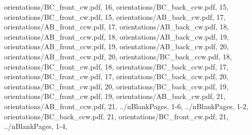 \documentclass[letterpaper]{article}
\begin{document}
{			orientations/BC_front_cw.pdf, 	16,	
			orientations/BC_back_ccw.pdf, 	15,	
			orientations/BC_front_cw.pdf, 	15,	
			orientations/AB_back_cw.pdf, 		17,
			orientations/AB_front_ccw.pdf, 	17,
			orientations/AB_back_cw.pdf, 		18,
			orientations/AB_front_ccw.pdf, 	18,
			orientations/AB_back_cw.pdf, 		19,
			orientations/AB_front_ccw.pdf, 	19,
			orientations/AB_back_cw.pdf, 		20,
			orientations/AB_front_ccw.pdf, 	20,
			orientations/BC_back_ccw.pdf, 	18,	
			orientations/BC_front_cw.pdf, 	18,	
			orientations/BC_back_ccw.pdf, 	17,	
			orientations/BC_front_cw.pdf, 	17,	
			orientations/BC_back_ccw.pdf, 	20,	
			orientations/BC_front_cw.pdf, 	20,	
			orientations/BC_back_ccw.pdf, 	19,	
			orientations/BC_front_cw.pdf, 	19,	
			orientations/AB_back_cw.pdf, 		21,
			orientations/AB_front_ccw.pdf, 	21,
			../nBlankPages,							1-6,
			../nBlankPages,							1-2,
			orientations/BC_back_ccw.pdf, 	21,	
			orientations/BC_front_cw.pdf, 	21,	
			../nBlankPages,							1-4,
		}
\end{document}
